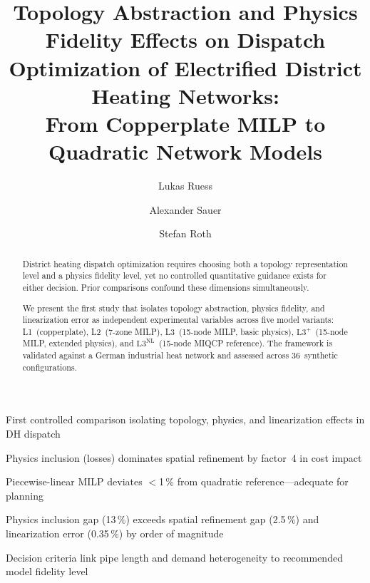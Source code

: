 \documentclass[review,3p]{elsarticle}
\newcommand{\Lplus}{\mathrm{L3}^{+}}
\newcommand{\Lnl}{\mathrm{L3}^{\mathrm{NL}}}
\begin{document}
\begin{frontmatter}

\title{Topology Abstraction and Physics Fidelity Effects on Dispatch
Optimization of Electrified District Heating Networks:\\
From Copperplate MILP to Quadratic Network Models}

\author[IPA]{Lukas Ruess}
\author[EEP]{Alexander Sauer}
\author[e-con]{Stefan Roth}


\address[IPA]{Fraunhofer-Institut für Produktionstechnik und Automatisierung, Stuttgart, Germany}
\address[EEP]{Institut für Energieeffizienz in der Produktion, Stuttgart, Germany}
\address[e-con]{e-con AG, Memmingen, Germany}


\begin{highlights}
  \item First controlled comparison isolating topology, physics, and
        linearization effects in DH dispatch
  \item Physics inclusion (losses) dominates spatial refinement by
        factor~4 in cost impact
  \item Piecewise-linear MILP deviates $<$1\,\% from
        quadratic reference---adequate for planning
  \item Physics inclusion gap (13\,\%) exceeds spatial refinement gap
        (2.5\,\%) and linearization error (0.35\,\%) by order of magnitude
  \item Decision criteria link pipe length and demand heterogeneity
        to recommended model fidelity level
\end{highlights}

\begin{abstract}
District heating dispatch optimization requires choosing both a
topology representation level and a physics fidelity level, yet no
controlled quantitative guidance exists for either decision. Prior
comparisons confound these dimensions simultaneously.

We present the first study that isolates topology abstraction,
physics fidelity, and linearization error as independent experimental
variables across five model variants: L1~(copperplate), L2~(7-zone
MILP), L3~(15-node MILP, basic physics), $\Lplus$~(15-node MILP,
extended physics), and $\Lnl$~(15-node MIQCP reference). The
framework is validated against a German industrial heat network and
assessed across 36~synthetic configurations.


\end{abstract}
\end{frontmatter}
\end{document}
